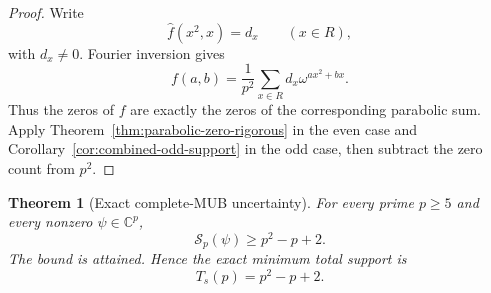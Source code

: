 \documentclass[11pt]{article}
\newtheorem{theorem}{Theorem}[section]
\newcommand{\C}{\mathbb C}
\begin{document}
\begin{proof}
Write
\[
 \widehat f(x^2,x)=d_x
 \qquad(x\in R),
\]
with \(d_x\ne0\).  Fourier inversion gives
\[
 f(a,b)
 =
 \frac1{p^2}
 \sum_{x\in R}d_x\omega^{ax^2+bx}.
\]
Thus the zeros of \(f\) are exactly the zeros of the corresponding
parabolic sum.  Apply Theorem~\ref{thm:parabolic-zero-rigorous} in the
even case and Corollary~\ref{cor:combined-odd-support} in the odd case,
then subtract the zero count from \(p^2\).
\end{proof}

\begin{theorem}[Exact complete-MUB uncertainty]
\label{thm:exact-mub-rigorous}
For every prime \(p\ge5\) and every nonzero
\(\psi\in\C^p\),
\begin{equation}
 \boxed{
 \mathcal S_p(\psi)\ge p^2-p+2.
 }
 \label{eq:exact-mub-bound-rigorous}
\end{equation}
The bound is attained.  Hence the exact minimum total support is
\begin{equation}
 \boxed{
 T_s(p)=p^2-p+2.
 }
 \label{eq:Ts-rigorous}
\end{equation}
\end{theorem}
\end{document}
